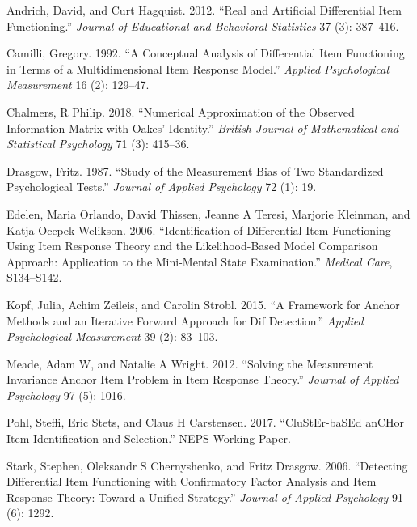 \documentclass[
  11pt,
]{article}
\begin{document}
\leavevmode\hypertarget{ref-andrich2012real}{}%
Andrich, David, and Curt Hagquist. 2012. ``Real and Artificial Differential Item Functioning.'' \emph{Journal of Educational and Behavioral Statistics} 37 (3): 387--416.

\leavevmode\hypertarget{ref-camilli1992conceptual}{}%
Camilli, Gregory. 1992. ``A Conceptual Analysis of Differential Item Functioning in Terms of a Multidimensional Item Response Model.'' \emph{Applied Psychological Measurement} 16 (2): 129--47.

\leavevmode\hypertarget{ref-chalmers2018numerical}{}%
Chalmers, R Philip. 2018. ``Numerical Approximation of the Observed Information Matrix with Oakes' Identity.'' \emph{British Journal of Mathematical and Statistical Psychology} 71 (3): 415--36.

\leavevmode\hypertarget{ref-drasgow1987study}{}%
Drasgow, Fritz. 1987. ``Study of the Measurement Bias of Two Standardized Psychological Tests.'' \emph{Journal of Applied Psychology} 72 (1): 19.

\leavevmode\hypertarget{ref-edelen2006identification}{}%
Edelen, Maria Orlando, David Thissen, Jeanne A Teresi, Marjorie Kleinman, and Katja Ocepek-Welikson. 2006. ``Identification of Differential Item Functioning Using Item Response Theory and the Likelihood-Based Model Comparison Approach: Application to the Mini-Mental State Examination.'' \emph{Medical Care}, S134--S142.

\leavevmode\hypertarget{ref-kopf2015framework}{}%
Kopf, Julia, Achim Zeileis, and Carolin Strobl. 2015. ``A Framework for Anchor Methods and an Iterative Forward Approach for Dif Detection.'' \emph{Applied Psychological Measurement} 39 (2): 83--103.

\leavevmode\hypertarget{ref-meade2012solving}{}%
Meade, Adam W, and Natalie A Wright. 2012. ``Solving the Measurement Invariance Anchor Item Problem in Item Response Theory.'' \emph{Journal of Applied Psychology} 97 (5): 1016.

\leavevmode\hypertarget{ref-pohl2017cluster}{}%
Pohl, Steffi, Eric Stets, and Claus H Carstensen. 2017. ``CluStEr-baSEd anCHor Item Identification and Selection.'' NEPS Working Paper.

\leavevmode\hypertarget{ref-stark2006detecting}{}%
Stark, Stephen, Oleksandr S Chernyshenko, and Fritz Drasgow. 2006. ``Detecting Differential Item Functioning with Confirmatory Factor Analysis and Item Response Theory: Toward a Unified Strategy.'' \emph{Journal of Applied Psychology} 91 (6): 1292.
\end{document}
